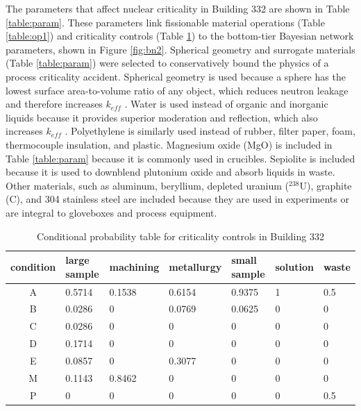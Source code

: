 The parameters that affect nuclear criticality in Building 332 are shown in Table \ref{table:param}.
These parameters link fissionable material operations (Table \ref{table:op1}) and criticality controls (Table \ref{table:ctrl2}) to the bottom-tier Bayesian network parameters, shown in Figure \ref{fig:bn2}.
Spherical geometry and surrogate materials (Table \ref{table:param}) were selected to conservatively bound the physics of a process criticality accident.
Spherical geometry is used because a sphere has the lowest surface area-to-volume ratio of any object, which reduces neutron leakage and therefore increases $k_{eff}$ \cite{knief}.
Water is used instead of organic and inorganic liquids because it provides superior moderation and reflection, which also increases $k_{eff}$ \cite{knief}.
Polyethylene is similarly used instead of rubber, filter paper, foam, thermocouple insulation, and plastic.
Magnesium oxide (MgO) is included in Table \ref{table:param} because it is commonly used in crucibles.
Sepiolite is included because it is used to downblend plutonium oxide and absorb liquids in waste.
Other materials, such as aluminum, beryllium, depleted uranium ($^{238}$U), graphite (C), and 304 stainless steel are included because they are used in experiments or are integral to gloveboxes and process equipment.
%
\begin{table}
  \caption{Conditional probability table for criticality controls in Building 332}
  \label{table:ctrl2}
  \renewcommand\arraystretch{1.5}
  \begin{center}
    \begin{tabular}{|c l l l l l l|}
      \hline
      condition & large sample & machining & metallurgy & small sample & solution & waste \\
      \hline
      A         & 0.5714       & 0.1538    & 0.6154     & 0.9375       & 1        & 0.5 \\
      B         & 0.0286       & 0         & 0.0769     & 0.0625       & 0        & 0 \\
      C         & 0.0286       & 0         & 0          & 0            & 0        & 0 \\
      D         & 0.1714       & 0         & 0          & 0            & 0        & 0 \\
      E         & 0.0857       & 0         & 0.3077     & 0            & 0        & 0 \\
      M         & 0.1143       & 0.8462    & 0          & 0            & 0        & 0 \\
      P         & 0            & 0         & 0          & 0            & 0        & 0.5 \\
      \hline
    \end{tabular}
  \end{center}
\end{table}

